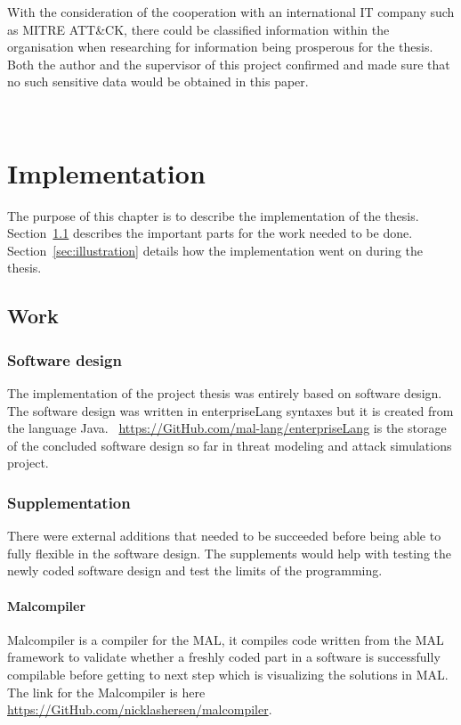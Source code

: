 \documentclass[english]{kththesis}
\begin{document}
 With the consideration of the cooperation with an international IT company such as MITRE ATT\&CK,  there could be classified information within the organisation when researching for information being prosperous for the thesis. Both the author and the supervisor of this project confirmed and made sure that no such sensitive data would be obtained in this paper.

\clearpage
\newpage
\mbox{~}
\clearpage
\newpage
\chapter{Implementation}
\label{ch:implementation}

The purpose of this chapter is to describe the implementation of the thesis. Section~\ref{sec:work} describes the important parts for the work needed to be done. Section~\ref{sec:illustration} details how the implementation went on during the thesis.

\section{Work}
\label{sec:work}

\subsection{Software design}
\noindent The implementation of the project thesis was entirely based on software design. The software design was written in enterpriseLang syntaxes but it is created from the language Java. ~\url{https://GitHub.com/mal-lang/enterpriseLang} is the storage of the concluded software design so far in threat modeling and attack simulations project.

\subsection{Supplementation}
There were external additions that needed to be succeeded before being able to fully flexible in the software design. The supplements would help with testing the newly coded software design and test the limits of the programming.

\subsubsection{Malcompiler}
Malcompiler is a compiler for the \gls{MAL}, it compiles code written from the \gls{MAL} framework to validate whether a freshly coded part in a software is successfully compilable before getting to next step which is visualizing the solutions in \gls{MAL}. The link for the Malcompiler is here \url{https://GitHub.com/nicklashersen/malcompiler}.
\end{document}

